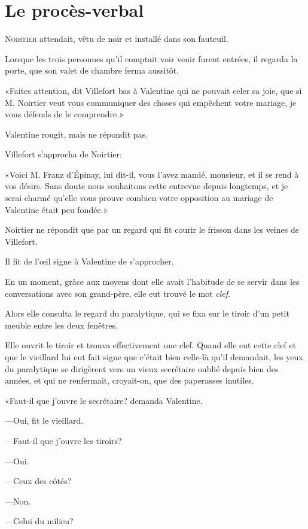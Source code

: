 \chapter{Le procès-verbal}

\lettrine{N}{oirtier} attendait, vêtu de noir et installé dans son fauteuil. 

\zz
Lorsque les trois personnes qu'il comptait voir venir furent entrées, il regarda la porte, que son valet de chambre ferma aussitôt. 

«Faites attention, dit Villefort bas à Valentine qui ne pouvait celer sa joie, que si M. Noirtier veut vous communiquer des choses qui empêchent votre mariage, je vous défends de le comprendre.» 

Valentine rougit, mais ne répondit pas. 

Villefort s'approcha de Noirtier: 

«Voici M. Franz d'Épinay, lui dit-il, vous l'avez mandé, monsieur, et il se rend à vos désirs. Sans doute nous souhaitons cette entrevue depuis longtemps, et je serai charmé qu'elle vous prouve combien votre opposition au mariage de Valentine était peu fondée.» 

Noirtier ne répondit que par un regard qui fit courir le frisson dans les veines de Villefort. 

Il fit de l'œil signe à Valentine de s'approcher. 

En un moment, grâce aux moyens dont elle avait l'habitude de se servir dans les conversations avec son grand-père, elle eut trouvé le mot \textit{clef}. 

Alors elle consulta le regard du paralytique, qui se fixa sur le tiroir d'un petit meuble entre les deux fenêtres. 

Elle ouvrit le tiroir et trouva effectivement une clef. Quand elle eut cette clef et que le vieillard lui eut fait signe que c'était bien celle-là qu'il demandait, les yeux du paralytique se dirigèrent vers un vieux secrétaire oublié depuis bien des années, et qui ne renfermait, croyait-on, que des paperasses inutiles. 

«Faut-il que j'ouvre le secrétaire? demanda Valentine. 

—Oui, fit le vieillard. 

—Faut-il que j'ouvre les tiroirs? 

—Oui. 

—Ceux des côtés?  

—Non. 

—Celui du milieu? 

